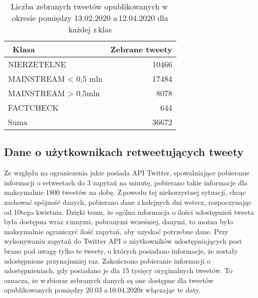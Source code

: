 \begin{table}[!h] \centering
\caption{Liczba zebranych tweetów opublikowanych w\,okresie pomiędzy 13.02.2020 a\,12.04.2020 dla każdej z\,klas}  \label{tab:zebranetweety}
\begin{tabular}{|l|r|} 
\hline
~Klasa & Zebrane tweety \\ 
\hline \hline
NIERZETELNE & 10466 \\ 
\hline
MAINSTREAM \textless{} 0,5 mln & 17484 \\ 
\hline
MAINSTREAM \textgreater{} 0,5mln & 8078 \\ 
\hline
FACTCHECK & 644 \\
\hline 
Suma & 36672 \\
\hline 
\end{tabular}

\end{table}

\subsection{Dane o użytkownikach retweetujących tweety}
Ze względu na ograniczenia jakie posiada API Twitter, spowalniające pobieranie informacji o retweetach do 3 zapytań na minutę, pobierano takie informacje dla maksymalnie 1800 tweetów na dobę. Z\,powodu tej niekorzystnej sytuacji, chcąc zachować spójność danych, pobierano dane z\,kolejnych dni wstecz, rozpoczynając od 10tego kwietnia. Dzięki temu, że ogólna informacja o ilości udostępnień tweeta była dostępna wraz z\,innymi, pobranymi wcześniej, danymi, to można było maksymalnie ograniczyć ilość zapytań, aby uzyskać potrzebne dane. Przy wykonywaniu zapytań do Twitter API o użytkowników udostępniających post brano pod uwagę tylko te tweety, o których posiadano informacje, że zostały udostępnione przynajmniej raz. Zakończono pobieranie informacji o udostępnieniach, gdy posiadano je dla 15 tysięcy oryginalnych tweetów. To oznacza, że w\,zbiorze zebranych danych są one dostępne dla tweetów opublikowanych pomiędzy 20.03 a\,10.04.2020r włączając te daty.  